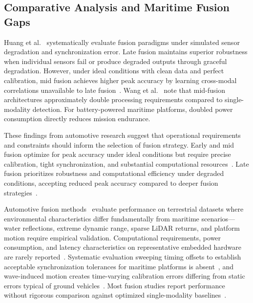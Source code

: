 \documentclass{erauthesis}
\begin{document}
\subsection{Comparative Analysis and Maritime Fusion Gaps}

Huang et al.~\cite{huang2024a} systematically evaluate fusion paradigms under simulated sensor degradation and synchronization error.
Late fusion maintains superior robustness when individual sensors fail or produce degraded outputs through graceful degradation.
However, under ideal conditions with clean data and perfect calibration, mid fusion achieves higher peak accuracy by learning cross-modal correlations unavailable to late fusion~\cite{huang2024a}.
Wang et al.~\cite{wang2020a} note that mid-fusion architectures approximately double processing requirements compared to single-modality detection.
For battery-powered maritime platforms, doubled power consumption directly reduces mission endurance.

These findings from automotive research suggest that operational requirements and constraints should inform the selection of fusion strategy.
Early and mid fusion optimize for peak accuracy under ideal conditions but require precise calibration, tight synchronization, and substantial computational resources~\cite{feng2021, cui2022}.
Late fusion prioritizes robustness and computational efficiency under degraded conditions, accepting reduced peak accuracy compared to deeper fusion strategies~\cite{huang2024a, wang2020a}.

Automotive fusion methods~\cite{feng2021, cui2022, huang2024a} evaluate performance on terrestrial datasets where environmental characteristics differ fundamentally from maritime scenarios—water reflections, extreme dynamic range, sparse \ac{LiDAR} returns, and platform motion require empirical validation.
Computational requirements, power consumption, and latency characteristics on representative embedded hardware are rarely reported~\cite{liu2023a}.
Systematic evaluation sweeping timing offsets to establish acceptable synchronization tolerances for maritime platforms is absent~\cite{huang2024a}, and wave-induced motion creates time-varying calibration errors differing from static errors typical of ground vehicles~\cite{cui2022}.
Most fusion studies report performance without rigorous comparison against optimized single-modality baselines~\cite{farahnakian2020, haghbayan2018, Clunie2021}.

\end{document}
